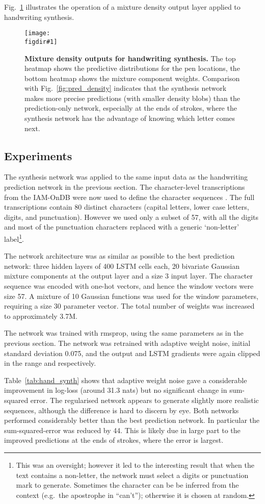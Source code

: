 \documentclass{article}
\newcommand{\eg}{e.g.\ }
\newcommand{\flabel}[1]{\label{fig:#1}}
\newcommand{\fref}[1]{Fig.~\ref{fig:#1}}
\newcommand{\tref}[1]{Table~\ref{tab:#1}}
\newcommand{\figdir}{}
\newcommand{\capt}[2]{\caption[#1]{\textbf{#1}#2}}
\newcommand{\fig}[5]
{
\begin{figure}
\begin{center}
\texttt{[image: \\figdir\#1]}
\end{center}
\capt{#4}{#5}
\flabel{#2}
\end{figure}
}
\begin{document}
\fref{synth_density} illustrates the operation of a mixture density output layer applied to handwriting synthesis.

\fig{synth_density}{synth_density}{1}{Mixture density outputs for handwriting synthesis.}{ The top heatmap shows the predictive distributions for the pen locations, the bottom heatmap shows the mixture component weights. Comparison with \fref{pred_density} indicates that the synthesis network makes more precise predictions (with smaller density blobs) than the prediction-only network, especially at the ends of strokes, where the synthesis network has the advantage of knowing which letter comes next.}

\subsection{Experiments}
The synthesis network was applied to the same input data as the handwriting prediction network in the previous section.
The character-level transcriptions from the IAM-OnDB were now used to define the character sequences .
The full transcriptions contain 80 distinct characters (capital letters, lower case letters, digits, and punctuation). 
However we used only a subset of 57, with all the digits and most of the punctuation characters replaced with a generic `non-letter' label\footnote{This was an oversight; however it led to the interesting result that when the text contains a non-letter, the network must select a digits or punctuation mark to generate. Sometimes the character can be be inferred from the context (\eg the apostrophe in ``can't''); otherwise it is chosen at random.}.

The network architecture was as similar as possible to the best prediction network: three hidden layers of 400 LSTM cells each, 20 bivariate Gaussian mixture components at the output layer and a size 3 input layer.
The character sequence was encoded with one-hot vectors, and hence the window vectors were size 57.
A mixture of 10 Gaussian functions was used for the window parameters, requiring a size 30 parameter vector.
The total number of weights was increased to approximately 3.7M.

The network was trained with rmsprop, using the same parameters as in the previous section.
The network was retrained with adaptive weight noise, initial standard deviation 0.075, and the output and LSTM gradients were again clipped in the range  and  respectively.

\tref{hand_synth} shows that adaptive weight noise gave a considerable improvement in log-loss (around 31.3 nats) but no significant change in sum-squared error.
The regularised network appears to generate slightly more realistic sequences, although the difference is hard to discern by eye.
Both networks performed considerably better than the best prediction network.
In particular the sum-squared-error was reduced by 44.
This is likely due in large part to the improved predictions at the ends of strokes, where the error is largest.
\end{document}
